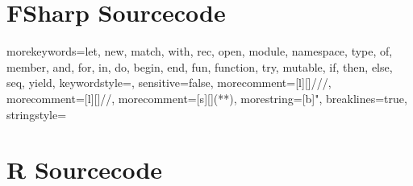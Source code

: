 \documentclass{article}
\begin{document}
\clearpage



\newpage
\appendix
\section{FSharp Sourcecode}


{morekeywords={let, new, match, with, rec, open, module, namespace, type, of, member, and, for, in, do, begin, end, fun, function, try, mutable, if, then, else, seq, yield},
keywordstyle=\color{bluekeywords},
sensitive=false,
morecomment=[l][\color{greencomments}]{///},
morecomment=[l][\color{greencomments}]{//},
morecomment=[s][\color{greencomments}]{{(*}{*)}},
morestring=[b]",
breaklines=true,  %
stringstyle=\color{redstrings}
}



\newpage
\section{R Sourcecode}




\end{document}
